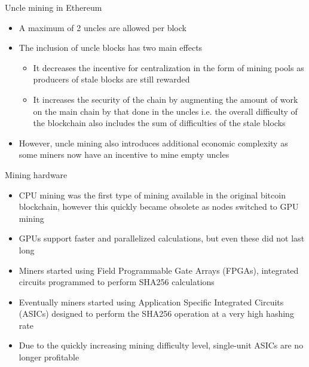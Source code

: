 \documentclass[11pt]{beamer}
\begin{document}

\begin{frame}{Uncle mining in Ethereum}
	\begin{itemize}
		\item A maximum of 2 uncles are allowed per block
		\item The inclusion of uncle blocks has two main effects
		\begin{itemize}
			\item It decreases the incentive for centralization in the form of mining pools as producers of stale blocks are still rewarded
			\item It increases the security of the chain by augmenting the amount of work on the main chain by that done in the uncles i.e. the overall difficulty of the blockchain also includes the sum of difficulties of the stale blocks
		\end{itemize}
		\item However, uncle mining also introduces additional economic complexity as some miners now have an incentive to mine empty uncles
	\end{itemize}
\end{frame}


\begin{frame}{Mining hardware}
	\begin{itemize}
		\item CPU mining was the first type of mining available in the original bitcoin blockchain, however this quickly became obsolete as nodes switched to GPU mining
		\item GPUs support faster and parallelized calculations, but even these did not last long
		\item Miners started using Field Programmable Gate Arrays (FPGAs), integrated circuits programmed to perform SHA256 calculations
		\item Eventually miners started using Application Specific Integrated Circuits (ASICs) designed to perform the SHA256 operation at a very high hashing rate
		\item Due to the quickly increasing mining difficulty level, single-unit ASICs are no longer profitable
	\end{itemize}
\end{frame}

\end{document}
